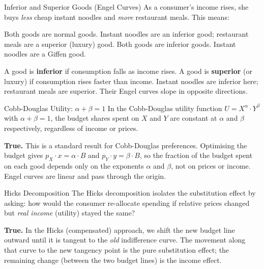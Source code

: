 \documentclass[paper=a5]{scrartcl}
\begin{document}
\begin{question}[type=mc]{Inferior and Superior Goods (Engel Curves)}
As a consumer's income rises, she buys \emph{less} cheap instant noodles and
\emph{more} restaurant meals. This means:
\begin{choices}
  \choice        Both goods are normal goods.
  \correctchoice Instant noodles are an inferior good; restaurant meals are a
                 superior (luxury) good.
  \choice        Both goods are inferior goods.
  \choice        Instant noodles are a Giffen good.
\end{choices}
\begin{solution}
  A good is \textbf{inferior} if consumption falls as income rises. A good is
  \textbf{superior} (or luxury) if consumption rises faster than income.
  Instant noodles are inferior here; restaurant meals are superior.
  Their Engel curves slope in opposite directions.
\end{solution}
\end{question}

\begin{question}[type=tf]{Cobb-Douglas Utility: $\alpha + \beta = 1$}
In the Cobb-Douglas utility function $U = X^{\alpha} \cdot Y^{\beta}$ with
$\alpha + \beta = 1$, the budget shares spent on $X$ and $Y$ are constant
at $\alpha$ and $\beta$ respectively, regardless of income or prices.
\truefalse[true]
\begin{solution}
  \textbf{True.} This is a standard result for Cobb-Douglas preferences.
  Optimising the budget gives $p_X \cdot x = \alpha \cdot B$ and
  $p_Y \cdot y = \beta \cdot B$, so the fraction of the budget spent on each
  good depends only on the exponents $\alpha$ and $\beta$, not on prices or
  income. Engel curves are linear and pass through the origin.
\end{solution}
\end{question}

\begin{question}[type=tf]{Hicks Decomposition}
The Hicks decomposition isolates the substitution effect by asking: how
would the consumer re-allocate spending if relative prices changed but
\emph{real income} (utility) stayed the same?
\truefalse[true]
\begin{solution}
  \textbf{True.} In the Hicks (compensated) approach, we shift the new budget
  line outward until it is tangent to the \emph{old} indifference curve.
  The movement along that curve to the new tangency point is the pure
  substitution effect; the remaining change (between the two budget lines) is
  the income effect.
\end{solution}
\end{question}
\end{document}
